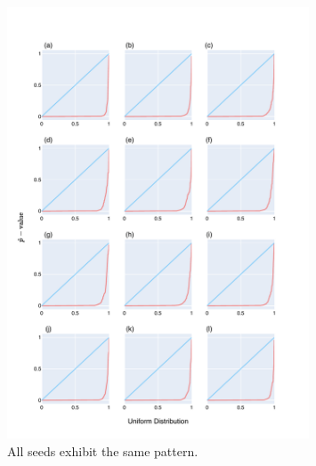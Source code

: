 \begin{figure}[!ht]
\centering
\includegraphics[width=0.8\textwidth]{figures/plots/synthetic/chi2/all_seeds.pdf}
\caption{All seeds exhibit the same pattern.}
\label{fig:synthetic/chi2/all-seeds}
\end{figure}